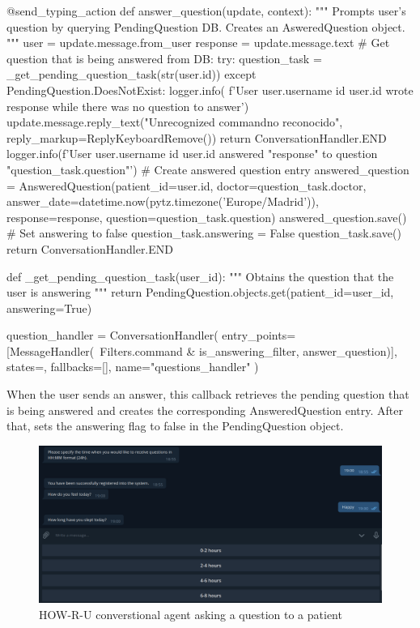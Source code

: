 \documentclass[12pt,english]{article}
\begin{document}
\begin{python}[caption={Questions handler}, captionpos=b]
@send_typing_action
def answer_question(update, context):
    """
    Prompts user's question by querying PendingQuestion DB.
    Creates an AsweredQuestion object.
    """
    user = update.message.from_user
    response = update.message.text
    # Get question that is being answered from DB:
    try:
        question_task = _get_pending_question_task(str(user.id))
    except PendingQuestion.DoesNotExist:
        logger.info(
            f'User {user.username} id {user.id} wrote {response} while there was no question to answer')
        update.message.reply_text("Unrecognized command\nComando no reconocido", reply_markup=ReplyKeyboardRemove())
        return ConversationHandler.END
    logger.info(f'User {user.username} id {user.id} answered "{response}" to question "{question_task.question}"')
    # Create answered question entry
    answered_question = AnsweredQuestion(patient_id=user.id, doctor=question_task.doctor, answer_date=datetime.now(pytz.timezone('Europe/Madrid')), response=response, question=question_task.question)
    answered_question.save()
    # Set answering to false
    question_task.answering = False
    question_task.save()
    return ConversationHandler.END

def _get_pending_question_task(user_id):
    """
    Obtains the question that the user is answering
    """
    return PendingQuestion.objects.get(patient_id=user_id, answering=True)


question_handler = ConversationHandler(
    entry_points=[MessageHandler(~Filters.command & is_answering_filter, answer_question)],
    states={},
    fallbacks=[],
    name="questions_handler"
)

\end{python}

When the user sends an answer, this callback retrieves the pending question that is being answered and creates the corresponding AnsweredQuestion entry. After that, sets the answering flag to false in the PendingQuestion object.

\begin{figure}[H]
  \centering
    \includegraphics[width=\textwidth]{bot_answering.png}
  \caption{HOW-R-U converstional agent asking a question to a patient}
\end{figure}
\end{document}

